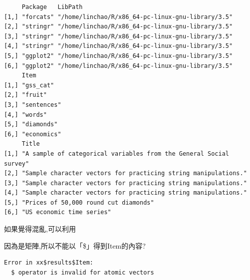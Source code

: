 \documentclass[]{book}
\newenvironment{Shaded}{\begin{snugshade}}{\end{snugshade}}
\newcommand{\KeywordTok}[1]{\textcolor[rgb]{0.13,0.29,0.53}{\textbf{#1}}}
\newcommand{\NormalTok}[1]{#1}
\newcommand{\OperatorTok}[1]{\textcolor[rgb]{0.81,0.36,0.00}{\textbf{#1}}}
\theoremstyle{definition}
\theoremstyle{definition}
\theoremstyle{definition}
\theoremstyle{remark}
\begin{document}
\begin{Shaded}
\end{Shaded}

\begin{verbatim}
     Package   LibPath                                          
[1,] "forcats" "/home/linchao/R/x86_64-pc-linux-gnu-library/3.5"
[2,] "stringr" "/home/linchao/R/x86_64-pc-linux-gnu-library/3.5"
[3,] "stringr" "/home/linchao/R/x86_64-pc-linux-gnu-library/3.5"
[4,] "stringr" "/home/linchao/R/x86_64-pc-linux-gnu-library/3.5"
[5,] "ggplot2" "/home/linchao/R/x86_64-pc-linux-gnu-library/3.5"
[6,] "ggplot2" "/home/linchao/R/x86_64-pc-linux-gnu-library/3.5"
     Item       
[1,] "gss_cat"  
[2,] "fruit"    
[3,] "sentences"
[4,] "words"    
[5,] "diamonds" 
[6,] "economics"
     Title                                                             
[1,] "A sample of categorical variables from the General Social survey"
[2,] "Sample character vectors for practicing string manipulations."   
[3,] "Sample character vectors for practicing string manipulations."   
[4,] "Sample character vectors for practicing string manipulations."   
[5,] "Prices of 50,000 round cut diamonds"                             
[6,] "US economic time series"                                         
\end{verbatim}

如果覺得混亂,可以利用

\begin{Shaded}
\end{Shaded}

因為是矩陣,所以不能以「\$」得到Item的內容?

\begin{Shaded}
\end{Shaded}

\begin{verbatim}
Error in xx$results$Item:
  $ operator is invalid for atomic vectors
\end{verbatim}
\end{document}
